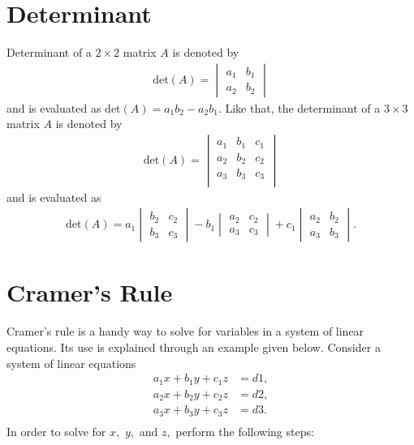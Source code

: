 \section{Determinant}
Determinant of a $2\times 2$ matrix $A$ is denoted by
\begin{align*}
\mathrm{det}(A) = 
\begin{vmatrix}
a_1 & b_1\\
a_2 & b_2
\end{vmatrix}
\end{align*}
and is evaluated as $\mathrm{det}(A) = a_1b_2 - a_2b_1.$ Like that, the determinant of a $3\times 3$ matrix $A$ is denoted by 
\begin{align*}
\mathrm{det}(A) = 
\begin{vmatrix}
a_1 & b_1 & c_1\\
a_2 & b_2 & c_2\\
a_3 & b_3 & c_3\\
\end{vmatrix}
\end{align*}
and is evaluated as 
\begin{align*}
\mathrm{det}(A) = a_1
\begin{vmatrix}
b_2 & c_2\\
b_3 & c_3
\end{vmatrix}
-b_1
\begin{vmatrix}
a_2 & c_2\\
a_3 & c_3
\end{vmatrix}
+c_1
\begin{vmatrix}
a_2 & b_2\\
a_3 & b_3
\end{vmatrix}.
\end{align*}

\section{Cramer's Rule}
Cramer's rule is a handy way to solve for variables in a system of linear equations. Its use is explained through an example given below. Consider a system of linear equations
\begin{align*}
a_1x + b_1y + c_1z &= d1,\\
a_2x + b_2y + c_2z &= d2,\\
a_3x + b_3y + c_3z &= d3.\\
\end{align*}
In order to solve for $x,$ $y,$ and $z,$ perform the following steps:

